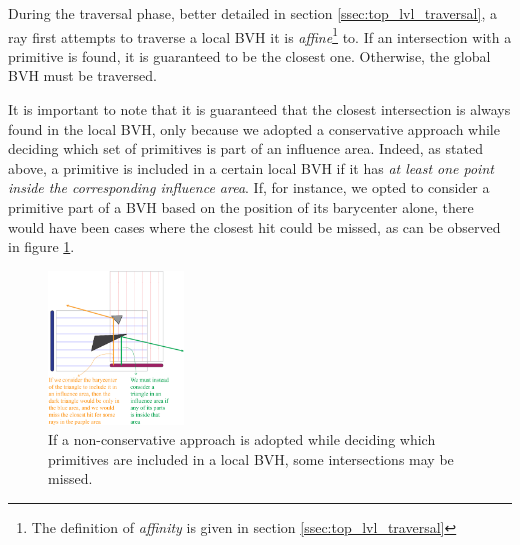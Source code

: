 \documentclass[acmtog, anonymous, review]{acmart}
\begin{document}
During the traversal phase, better detailed in section \ref{ssec:top_lvl_traversal}, a ray first attempts to traverse a local BVH it is \textit{affine}\footnote{The definition of \textit{affinity} is given in section \ref{ssec:top_lvl_traversal}} to. If an intersection with a primitive is found, it is guaranteed to be the closest one. Otherwise, the global BVH must be traversed.

It is important to note that it is guaranteed that the closest intersection is always found in the local BVH, only because we adopted a conservative approach while deciding which set of primitives is part of an influence area. Indeed, as stated above, a primitive is included in a certain local BVH if it has \textit{at least one point inside the corresponding influence area}. If, for instance, we opted to consider a primitive part of a BVH based on the position of its barycenter alone, there would have been cases where the closest hit could be missed, as can be observed in figure \ref{fig:double_area}.

\begin{figure}[H]
  \centering
  \includegraphics[width=0.32\textwidth]{Images/double_area.png}
  \caption{If a non-conservative approach is adopted while deciding which primitives are included in a local BVH, some intersections may be missed.}
  \label{fig:double_area} 
\end{figure}
\end{document}
